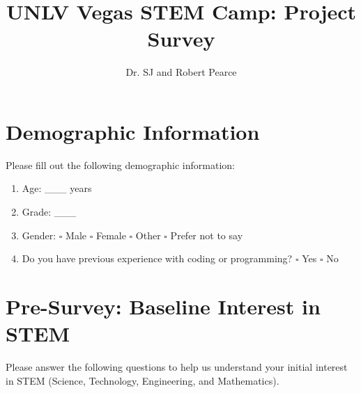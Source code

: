 \documentclass{article}
\title{UNLV Vegas STEM Camp: Project Survey}
\author{Dr. SJ and Robert Pearce}
\date{}
\begin{document}
\maketitle

\section*{Demographic Information}

Please fill out the following demographic information:

\begin{enumerate}
    \item Age: \_\_\_ years
    \item Grade: \_\_\_
    \item Gender: $\square$ Male $\square$ Female $\square$ Other $\square$ Prefer not to say
    \item Do you have previous experience with coding or programming? $\square$ Yes $\square$ No
\end{enumerate}

\section*{Pre-Survey: Baseline Interest in STEM}

Please answer the following questions to help us understand your initial interest in STEM (Science, Technology, Engineering, and Mathematics).
\end{document}

